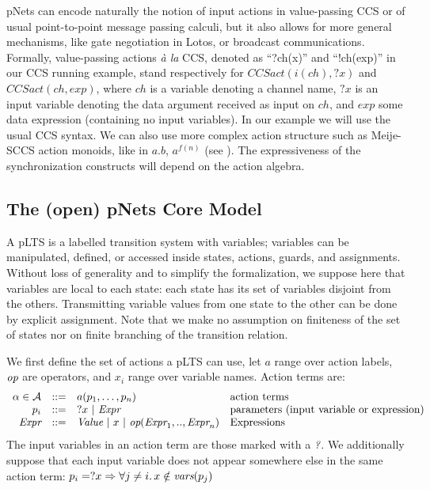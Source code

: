 \documentclass{lncs/llncs}
\def\AlgA{\mathcal{A}}
\begin{document}
pNets can encode naturally the notion of input actions in value-passing CCS
\cite{Milner89} or of usual point-to-point message passing calculi, but it also allows
for more general mechanisms, like gate negotiation in Lotos, or broadcast
communications.
Formally, value-passing actions \emph{\`a la} CCS, denoted as ``?ch(x)'' and ``!ch(exp)'' in our CCS running example, stand respectively for $CCSact(i(ch),?x)$ and $CCSact(ch,exp)$, where $ch$ is a variable denoting a channel name, $?x$ is an input variable denoting the data argument received as input on $ch$, and $exp$ some data expression (containing no input variables). In our example we will use the usual CCS syntax.
We can also use more complex action structure such as Meije-SCCS action
monoids, like in $a.b$, $a^{f(n)}$ (see \cite{deSimone85}). The expressiveness of the synchronization constructs
will depend on the action algebra.




\subsection{The (open) pNets Core Model}
\label{section:pNets}


A pLTS is a labelled transition system with variables; variables can be
manipulated, defined, or accessed inside states, actions, guards, and
assignments. Without loss of generality and to simplify the formalization, we suppose 
here that 
variables are local to each 
state: each state has its set of variables disjoint from the others. Transmitting 
variable values from one state to the other can be done by explicit assignment. 
Note that we make no assumption on finiteness of the set of states nor
on finite branching of the transition relation.

We first define the set of actions a pLTS can use, let $a$
range over action labels, $\symb{op}$ are operators, and $x_i$ range over
variable names. Action terms are:
\[
\begin{array}[l]{rcl@{\quad}p{5.5cm}}
  \alpha\in\AlgA&::=&a(p_1,\ldots,p_n)&\text{action terms}\\
  p_i&::=& ?x~|~\symb{Expr}&\text{parameters (input variable or expression)}\\
  \symb{Expr}&::=& \symb{Value}~|~x~|~\symb{op}(\symb{Expr}_1,..,\symb{Expr}_n)&\text{Expressions}
\end{array}
\]
The input variables in an action term are those marked with a
$\symb{?}$.
We additionally suppose that each input variable does not
appear somewhere else in the same action term:
$p_i=?x\Rightarrow\forall j\neq i.\, x\notin \vars(p_j)$
\end{document}
